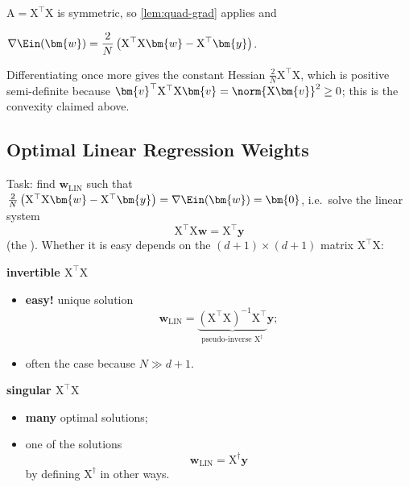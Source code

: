 \(\mathrm{A} = \mathrm{X}^\top \mathrm{X}\) is symmetric, so
\autoref{lem:quad-grad} applies and

\begin{moral}
    \(\displaystyle \nabla \Ein(\bm{w}) = \frac{2}{N} \left( \mathrm{X}^\top
    \mathrm{X} \bm{w} - \mathrm{X}^\top \bm{y} \right)\).
\end{moral}

Differentiating once more gives the constant Hessian \(\frac{2}{N}
\mathrm{X}^\top \mathrm{X}\), which is positive semi-definite because
\(\bm{v}^\top \mathrm{X}^\top \mathrm{X} \bm{v} = \norm{\mathrm{X} \bm{v}}^2
\ge 0\); this is the convexity claimed above.

\subsection{Optimal Linear Regression Weights}

Task: find \(\bm{w}_{\mathrm{LIN}}\) such that \(\frac{2}{N} \left(
\mathrm{X}^\top \mathrm{X} \bm{w} - \mathrm{X}^\top \bm{y} \right) = \nabla
\Ein(\bm{w}) = \bm{0}\), i.e.\ solve the linear system
\begin{equation}\label{eq:normal-eq}
    \mathrm{X}^\top \mathrm{X} \bm{w} = \mathrm{X}^\top \bm{y}
\end{equation}
(the ). Whether it is easy depends on the \((d+1)
\times (d+1)\) matrix \(\mathrm{X}^\top \mathrm{X}\):

\begin{center}
    \begin{minipage}[t]{0.47\textwidth}
        \textbf{invertible \(\mathrm{X}^\top \mathrm{X}\)}
        \begin{itemize}
            \item \textcolor{orange!85!black}{\textbf{easy!}} unique solution
            \[
                \bm{w}_{\mathrm{LIN}} =
                \underbrace{\left( \mathrm{X}^\top \mathrm{X} \right)^{-1}
                \mathrm{X}^\top}_{\text{pseudo-inverse } \mathrm{X}^\dagger}
                \bm{y} ;
            \]
            \item often the case because \(N \gg d + 1\).
        \end{itemize}
    \end{minipage}%
    \hfill
    \begin{minipage}[t]{0.47\textwidth}
        \textbf{singular \(\mathrm{X}^\top \mathrm{X}\)}
        \begin{itemize}
            \item \textcolor{orange!85!black}{\textbf{many}} optimal solutions;
            \item one of the solutions
            \[
                \bm{w}_{\mathrm{LIN}} = \mathrm{X}^\dagger \bm{y}
            \]
            by defining \(\mathrm{X}^\dagger\) in other ways.
        \end{itemize}
    \end{minipage}
\end{center}

